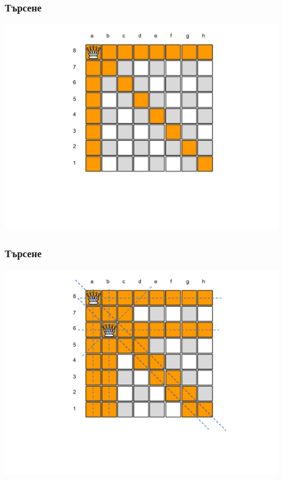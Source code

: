 \documentclass{beamer}
\begin{document}
\begin{frame}[fragile]
\frametitle{Търсене}
\begin{center}
\includegraphics[width=12cm]{images/cb_01}
\end{center}
\end{frame}

\begin{frame}[fragile]
\frametitle{Търсене}
\begin{center}
\includegraphics[width=12cm]{images/cb_02}
\end{center}
\end{frame}
\end{document}
